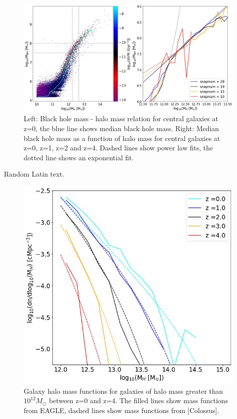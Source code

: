 \documentclass[12pt, onecolumn]{revtex4}    %
\begin{document}
\begin{figure}[H]
\centering
\includegraphics[width=17cm]{Plot_3.jpeg}
\caption{Left: Black hole mass - halo mass relation for central galaxies at z=0, the blue line shows median black hole mass. Right: Median black hole mass as a function of halo mass for central galaxies at z=0, z=1, z=2 and z=4. Dashed lines show power law fits, the dotted line shows an exponential fit.}
\label{fig:3}
\end{figure}

Random Latin text.

\begin{figure}[H]
\centering
\includegraphics[width=\linewidth]{Mass_Function.jpeg}
\caption{Galaxy halo mass functions for galaxies of halo mass greater than $10^{12}M_\odot$ between z=0 and z=4. The filled lines show mass functions from EAGLE, dashed lines show mass functions from [Colossus].}
\label{fig:4}
\end{figure}
\end{document}
